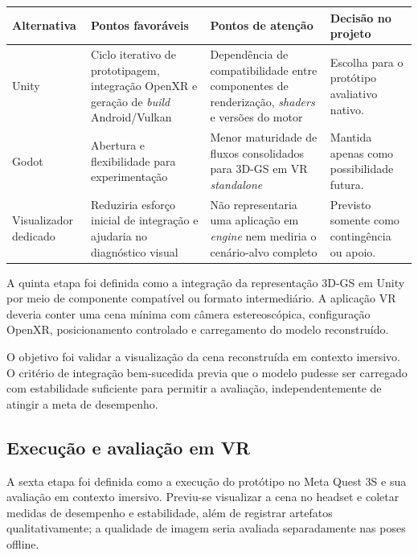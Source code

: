 \begin{quadro}[H]
\centering
\footnotesize
\caption{Comparação das alternativas de integração para o protótipo.}
\label{qua:decisao_engine}
\renewcommand{\arraystretch}{1.2}
\begin{tabularx}{\textwidth}{|p{2.6cm}|p{3.2cm}|p{3.2cm}|X|}
\hline
\textbf{Alternativa} & \textbf{Pontos favoráveis} & \textbf{Pontos de atenção} & \textbf{Decisão no projeto} \\ \hline

Unity & Ciclo iterativo de prototipagem, integração OpenXR e geração de \textit{build} Android/Vulkan & Dependência de compatibilidade entre componentes de renderização, \textit{shaders} e versões do motor & Escolha para o protótipo avaliativo nativo. \\ \hline

Godot & Abertura e flexibilidade para experimentação & Menor maturidade de fluxos consolidados para 3D-GS em VR \textit{standalone} & Mantida apenas como possibilidade futura. \\ \hline

Visualizador dedicado & Reduziria esforço inicial de integração e ajudaria no diagnóstico visual & Não representaria uma aplicação em \textit{engine} nem mediria o cenário-alvo completo & Previsto somente como contingência ou apoio. \\ \hline

\end{tabularx}
\end{quadro}

A quinta etapa foi definida como a integração da representação 3D-GS em Unity por meio de componente compatível ou formato intermediário. A aplicação VR deveria conter uma cena mínima com câmera estereoscópica, configuração OpenXR, posicionamento controlado e carregamento do modelo reconstruído.

O objetivo foi validar a visualização da cena reconstruída em contexto imersivo. O critério de integração bem-sucedida previa que o modelo pudesse ser carregado com estabilidade suficiente para permitir a avaliação, independentemente de atingir a meta de desempenho.

\subsection{Execução e avaliação em VR}

A sexta etapa foi definida como a execução do protótipo no Meta Quest 3S e sua avaliação em contexto imersivo. Previu-se visualizar a cena no headset e coletar medidas de desempenho e estabilidade, além de registrar artefatos qualitativamente; a qualidade de imagem seria avaliada separadamente nas poses offline.

